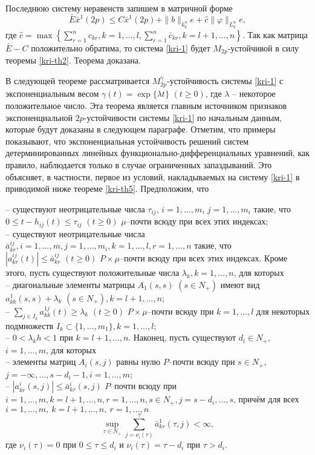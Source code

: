 Последнюю систему неравенств запишем в матричной форме
$$
\bar E\bar x^1 (2p) \leq C\bar x^1 (2p) + \|b\|_{k^n_{q}}e +
\hat c \|\varphi \|_{L^n_q} e,
$$
где $\hat c = \max \left \{ \sum \limits_{r=1}^{n}c_{kr}, k = 1, ...
,l, \sum \limits_{r=1}^{n}\bar c_{kr}, k = l + 1, ... ,n \right \}$.
Так как матрица  $\bar E - C$ положительно обратима, то система \eqref{kri-1}
будет $M_{2p}$-устойчивой в силу теоремы \ref{kri-th2}. Теорема доказана.

В следующей теореме рассматривается $M_{2p}^\gamma $-устойчивость
системы \eqref{kri-1} с экспоненциальным весом $\gamma (t) = \exp \{\lambda
t\} \,\, (t \geq 0)$, где $\lambda$ --  некоторое  положительное
число. Эта теорема является главным источником признаков
экспоненциальной $2p$-устойчивости системы \eqref{kri-1} по начальным данным,
которые будут доказаны в следующем параграфе. Отметим, что примеры
показывают, что экспоненциальная устойчивость решений систем
детерминированных линейных функционально-дифференциальных уравнений,
как правило,  наблюдается только в случае ограниченных запаздываний.
Это объясняет, в частности, первое из условий, накладываемых на
систему \eqref{kri-1} в приводимой ниже теореме \ref{kri-th5}. Предположим, что

\noindent
--
существуют неотрицательные числа $\tau_{ij}$, $i = 1,...,m$, $j =
1,...,m_i$  такие, что  $0 \leq t- h_{ij}(t) \leq \tau _{ij} {\,}
{\,} (t \geq 0)$ $\mu $--почти всюду при всех этих индексах;\\
--  существуют неотрицательные числа $\bar a^{ij}_{kr}, i =
1,...,m, j = 1,...,m_i, k =1,...,l, r = 1,...,n$ такие, что
$|a^{ij}_{kr}(t)|\leq \bar a^{ij}_{kr} \,\, (t\geq 0) $
$P\times\mu$--почти всюду при всех этих индексах.
Кроме этого, пусть существуют положительные числа $\lambda _k, k = 1, ...,
n$, для которых\\
\noindent
  -- диагональные элементы матрицы $ A_1(s,s)$ $(s \in
N_+)$ имеют вид $a_{kk}^{1}(s,s) + \lambda _k \,\, (s \in N_+), k=l
+ 1, ..., n$;\\
  --  $\sum \limits_{j\in I_k}a^{1j}_{kk}(t)  \geq
\lambda _k \,\, (t\geq 0)$ $P\times\mu$--почти всюду при $k =
1,...,l$ для некоторых подмножеств $I_k \subset \{1,..., m_1\}, k =
1,..., l$;\\
  -- $0 < \lambda _kh < 1$ при $ k = l + 1, ..., n$.
Наконец, пусть существуют $d_i \in N_+$, $i = 1,...,m$, для которых\\
\noindent
 -- элементы матриц
$A_i(s,j)$ равны нулю $P$--почти всюду при $s \in N_+$,
$j=-\infty,...,s-d_i-1, i=1,...,m$;\\
--  $|a^i_{kr}(s,j)| \leq \bar a^i_{kr}(s,j)$ $P$--почти
всюду при $i=1,...,m, k = l+1, ..., n, r = 1,...,n, s\in N_+,
j=s-d_i,...,s$, причём для всех $i= 1,...,m, \ k = l+1, ..., n, \ r
= 1,...,n$
$$\mathrel {\mathop {\sup}
\limits _{\tau \in N_+}}\sum \limits _{j=\nu _i (\tau)}^{\tau}\bar
a^{1}_{kr}(\tau,j) < \infty, $$ где $\nu _i (\tau) = 0$ при $0 \le
\tau \le d_i$ и  $\nu _i (\tau) = \tau - d_i$ при $\tau
> d_i$.

